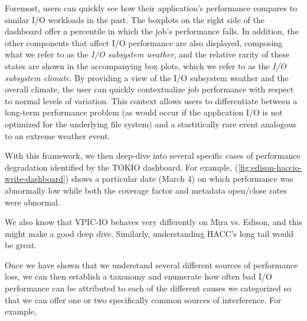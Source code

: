\documentclass[conference,10pt,compsocconf]{IEEEtran}
\begin{document}
Foremost, users can quickly see how their application's performance compares
to similar I/O workloads in the past.  The boxplots on the right side of the
dashboard offer a percentile in which the job's performance falls.  In addition,
the other components that affect I/O performance are also displayed, composing
what we refer to as the \emph{I/O subsystem weather}, and the relative rarity
of these states are shown in the accompanying box plots, which we refer to as
the \emph{I/O subsystem climate}.  By providing a view of the I/O subsystem
weather and the overall climate, the user can quickly contextualize job
performance with respect to normal levels of variation.  This context allows
users to differentiate between a long-term performance problem (as would occur
if the application I/O is not optimized for the underlying file system) and a
stastitically rare event analogous to an extreme weather event.

With this framework, we then deep-dive into several specific cases of
performance degradation identified by the TOKIO dashboard.  For example,
(\ref{fig:edison-haccio-write-dashboard}) shows a particular date (March 4) on
which performance was abnormally low while both the coverage factor and metadata
open/close rates were abnormal.

We also know that VPIC-IO behaves very differently on Mira vs. Edison, and this
might make a good deep dive.  Similarly, understanding HACC's long tail would
be great.

Once we have shown that we understand several different sources of performance
loss, we can then establish a taxonomy and enumerate how often bad I/O
performance can be attributed to each of the different causes we categorized so
that we can offer one or two specifically common sources of interference.  For
example,
\end{document}
